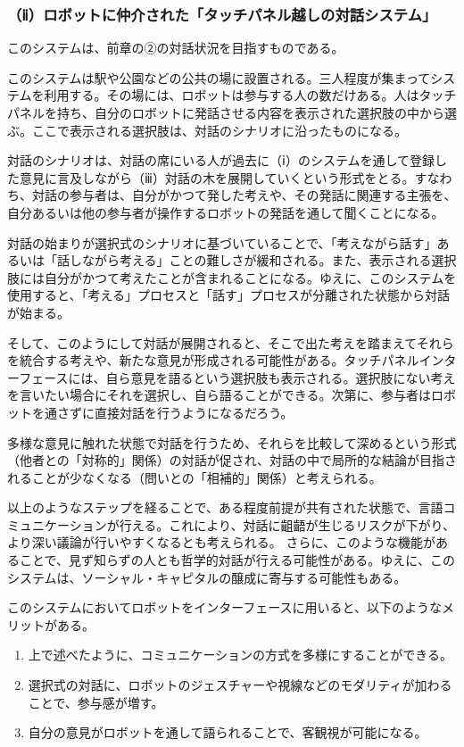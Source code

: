 \documentclass[b5j,twoside,twocolumn]{utarticle}
\begin{document}
\subsubsection*{（ⅱ）ロボットに仲介された「タッチパネル越しの対話システム」}
このシステムは、前章の②の対話状況を目指すものである。


このシステムは駅や公園などの公共の場に設置される。三人程度が集まってシステムを利用する。その場には、ロボットは参与する人の数だけある。人はタッチパネルを持ち、自分のロボットに発話させる内容を表示された選択肢の中から選ぶ。ここで表示される選択肢は、対話のシナリオに沿ったものになる。


対話のシナリオは、対話の席にいる人が過去に（ⅰ）のシステムを通して登録した意見に言及しながら（ⅲ）対話の木を展開していくという形式をとる。すなわち、対話の参与者は、自分がかつて発した考えや、その発話に関連する主張を、自分あるいは他の参与者が操作するロボットの発話を通して聞くことになる。


対話の始まりが選択式のシナリオに基づいていることで、「考えながら話す」あるいは「話しながら考える」ことの難しさが緩和される。また、表示される選択肢には自分がかつて考えたことが含まれることになる。ゆえに、このシステムを使用すると、「考える」プロセスと「話す」プロセスが分離された状態から対話が始まる。


そして、このようにして対話が展開されると、そこで出た考えを踏まえてそれらを統合する考えや、新たな意見が形成される可能性がある。タッチパネルインターフェースには、自ら意見を語るという選択肢も表示される。選択肢にない考えを言いたい場合にそれを選択し、自ら語ることができる。次第に、参与者はロボットを通さずに直接対話を行うようになるだろう。


多様な意見に触れた状態で対話を行うため、それらを比較して深めるという形式（他者との「対称的」関係）の対話が促され、対話の中で局所的な結論が目指されることが少なくなる（問いとの「相補的」関係）と考えられる。


以上のようなステップを経ることで、ある程度前提が共有された状態で、言語コミュニケーションが行える。これにより、対話に齟齬が生じるリスクが下がり、より深い議論が行いやすくなるとも考えられる。
さらに、このような機能があることで、見ず知らずの人とも哲学的対話が行える可能性がある。ゆえに、このシステムは、ソーシャル・キャピタルの醸成に寄与する可能性もある。




このシステムにおいてロボットをインターフェースに用いると、以下のようなメリットがある。
\begin{enumerate}
\renewcommand{\labelenumi}{\pbox<y>{(\arabic{enumi})}}
\item 上で述べたように、コミュニケーションの方式を多様にすることができる。
\item 選択式の対話に、ロボットのジェスチャーや視線などのモダリティが加わることで、参与感が増す。
\item 自分の意見がロボットを通して語られることで、客観視が可能になる。
\end{enumerate}
\end{document}

